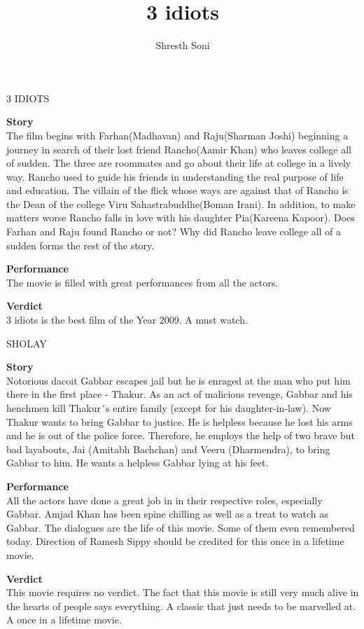 \documentclass{article}
\title{ 3 idiots}
\author{Shresth Soni}
\begin{document}
\begin{center}
\textmd {\huge 3 IDIOTS}
\end{center}

\begin{flushleft}
\textbf{Story}\\
The film begins with Farhan(Madhavan) and Raju(Sharman Joshi) beginning a journey in search of their lost friend Rancho(Aamir Khan) who leaves college all of sudden. The three are roommates and go about their life at college in a lively way. Rancho used to guide his friends in understanding the real purpose of life and education. The villain of the flick whose ways are against that of Rancho is the Dean of the college Viru Sahastrabuddhe(Boman Irani). In addition, to make matters worse Rancho falls in love with his daughter Pia(Kareena Kapoor). Does Farhan and Raju found Rancho or not? Why did Rancho leave college all of a sudden forms the rest of the story.\\
\vspace{3mm}

\textbf{Performance}\\
The movie is filled with great performances from all the actors.
\vspace{3mm}

\textbf{Verdict}\\
3 idiots is the best film of the Year 2009. A must watch.
\vspace{3mm}

\begin{center}
\textmd {\huge SHOLAY}
\end{center}
\textbf{Story}\\
Notorious dacoit Gabbar escapes jail but he is enraged at the man who put him there in the first place - Thakur. As an act of malicious revenge, Gabbar and his henchmen kill Thakur´s entire family (except for his daughter-in-law). Now Thakur wants to bring Gabbar to justice. He is helpless because he lost his arms and he is out of the police force. Therefore, he employs the help of two brave but bad layabouts, Jai (Amitabh Bachchan) and Veeru (Dharmendra), to bring Gabbar to him. He wants a helpless Gabbar lying at his feet.\\
\vspace{3mm}

\textbf{Performance}\\
All the actors have done a great job in in their respective roles, especially Gabbar. Amjad Khan has been spine chilling as well as a treat to watch as Gabbar. The dialogues are the life of this movie. Some of them even remembered today. Direction of Ramesh Sippy should be credited for this once in a lifetime movie.\\ 
\vspace{3mm}

\textbf{Verdict}\\
This movie requires no verdict. The fact that this movie is still very much alive in the hearts of people says everything. A classic that just needs to be marvelled at. A once in a lifetime movie.\\
\end{flushleft}
\end{document}
